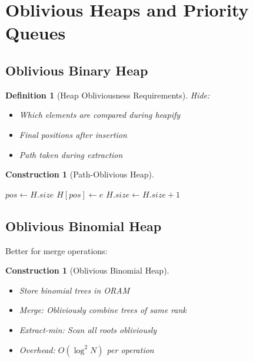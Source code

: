 \documentclass[11pt,final,hidelinks]{article}
\newtheorem{definition}[theorem]{Definition}
\newtheorem{construction}[theorem]{Construction}
\begin{document}
\section{Oblivious Heaps and Priority Queues}

\subsection{Oblivious Binary Heap}

\begin{definition}[Heap Obliviousness Requirements]
Hide:
\begin{itemize}
    \item Which elements are compared during heapify
    \item Final positions after insertion
    \item Path taken during extraction
\end{itemize}
\end{definition}

\begin{construction}[Path-Oblivious Heap]
\begin{algorithm}[H]
\caption{Oblivious Heap Insert}
$pos \gets H.size$\;
$H[pos] \gets e$\;
$H.size \gets H.size + 1$\;
\end{algorithm}
\end{construction}

\subsection{Oblivious Binomial Heap}

Better for merge operations:

\begin{construction}[Oblivious Binomial Heap]
\begin{itemize}
    \item Store binomial trees in ORAM
    \item Merge: Obliviously combine trees of same rank
    \item Extract-min: Scan all roots obliviously
    \item Overhead: $O(\log^2 N)$ per operation
\end{itemize}
\end{construction}
\end{document}
